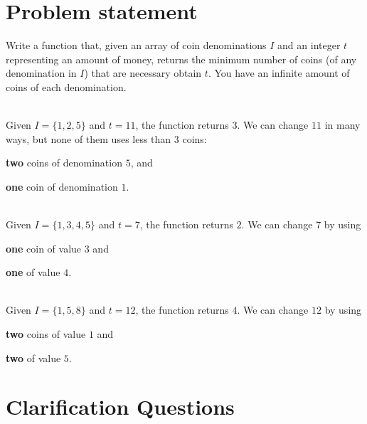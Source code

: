 \section{Problem statement}
\begin{exercise}
Write a function that, given an array of coin denominations $I$ and an integer $t$ representing an amount of money, returns
the minimum number of coins (of any denomination in $I$) that are necessary obtain $t$. 
You have an infinite amount of coins of each denomination. 

	\begin{example}
		\label{ex:coin_change:example1}
		\hfill \\
		Given $I=\{1,2,5\}$ and $t=11$, the function returns $3$.
		We can change $11$ in many ways, but none of them uses less than $3$ coins:
		\begin{itemize*}
			\item \textbf{two} coins of denomination $5$, and
			\item \textbf{one} coin of denomination $1$.
		\end{itemize*}
	\end{example}

	\begin{example}
		\hfill \\
		Given $I=\{1,3,4,5\}$ and $t=7$, the function returns $2$.
		We can change $7$ by using 
		\begin{itemize*}
			\item \textbf{one} coin of value $3$ and
			\item \textbf{one} of value $4$.
		\end{itemize*}
	\end{example}

	\begin{example}
		\label{ex:coin_change:example3}
		\hfill \\
		Given $I=\{1,5,8\}$ and $t=12$, the function returns $4$.
		We can change $12$ by using
		\begin{itemize*}
			\item \textbf{two} coins of value $1$ and
			\item \textbf{two} of value $5$.
		\end{itemize*}
	\end{example}
\end{exercise}

\section{Clarification Questions}


